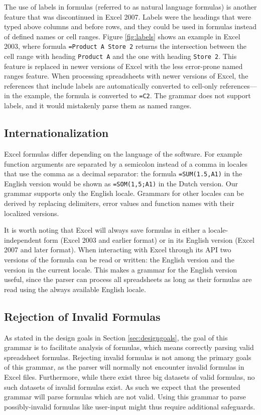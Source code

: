 \documentclass[times]{smrauth}
\begin{document}
The use of labels in formulas (referred to as natural language formulas) is another feature that was discontinued in Excel 2007.
Labels were the headings that were typed above columns and before rows, and they could be used in formulas instead of defined names or cell ranges.
Figure \ref{fig:labels} shows an example in Excel 2003, where formula \texttt{=Product A Store 2} returns the intersection between the cell range with heading \texttt{Product A} and the one with heading \texttt{Store 2}.
This feature is replaced in newer versions of Excel with the less error-prone named ranges feature.
When processing spreadsheets with newer versions of Excel, the references that include labels are automatically converted to cell-only references---in the example, the formula is converted to \texttt{=C2}.
The grammar does not support labels, and it would mistakenly parse them as named ranges.

\subsection{Internationalization}

Excel formulas differ depending on the language of the software. For example function arguments are separated by a semicolon instead of a comma in locales that use the comma as a decimal separator: the formula \texttt{=SUM(1.5,A1)} in the English version would be shown as \texttt{=SOM(1,5;A1)} in the Dutch version.
Our grammar supports only the English locale.
Grammars for other locales can be derived by replacing delimiters, error values and function names with their localized versions.

It is worth noting that Excel will always save formulas in either a locale-independent form (Excel 2003 and earlier format) or in its English version (Excel 2007 and later format). When interacting with Excel through its API two versions of the formula can be read or written: the English version and the version in the current locale.
This makes a grammar for the English version useful, since the parser can process all spreadsheets as long as their formulas are read using the always available English locale.

\subsection{Rejection of Invalid Formulas}

As stated in the design goals in Section \ref{sec:designgoals}, the goal of this grammar is to facilitate analysis of formulas, which means correctly parsing valid spreadsheet formulas.
Rejecting invalid formulas is not among the primary goals of this grammar, as the parser will normally not encounter invalid formulas in Excel files.
Furthermore, while there exist three big datasets of valid formulas, no such datasets of invalid formulas exist.
As such we expect that the presented grammar will parse formulas which are not valid.
Using this grammar to parse possibly-invalid formulas like user-input might thus require additional safeguards.
\end{document}
